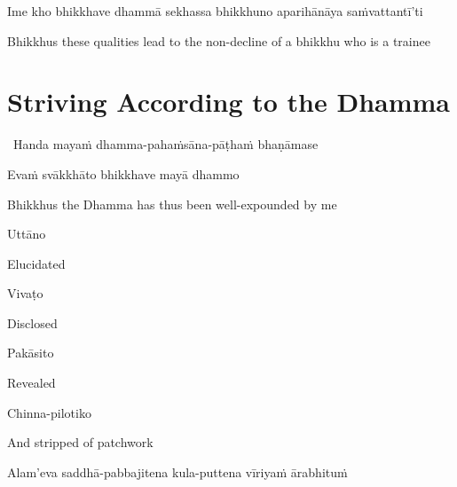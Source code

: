 \begin{pali-hang}
  Ime kho bhikkhave dhammā sekhassa bhikkhuno aparihānāya saṁvattantī'ti
\end{pali-hang}

\begin{english-hang}
  Bhikkhus these qualities lead to the non-decline of a bhikkhu who is a trainee
\end{english-hang}

\suttaRef{[AN 6.22 \& AN 8.79]}

\ifdigitalversion{}\fi



\section{Striving According to the Dhamma}
\label{striving-according-to-dhamma}

\begin{leader}
  \anglebracketleft\ \hspace{-0.5mm}Handa mayaṁ dhamma-pahaṁsāna-pāṭhaṁ bhaṇāmase \hspace{-0.5mm}\anglebracketright\
\end{leader}
Evaṁ svākkhāto bhikkhave mayā dhammo

\begin{english}
  Bhikkhus the Dhamma has thus been well-expounded by me
\end{english}

Uttāno

\begin{english}
  Elucidated
\end{english}

Vivaṭo

\begin{english}
  Disclosed
\end{english}

Pakāsito

\begin{english}
  Revealed
\end{english}

Chinna-pilotiko

\begin{english}
  And stripped of patchwork
\end{english}

Alam'eva saddhā-pabbajitena kula-puttena vīriyaṁ ārabhituṁ

